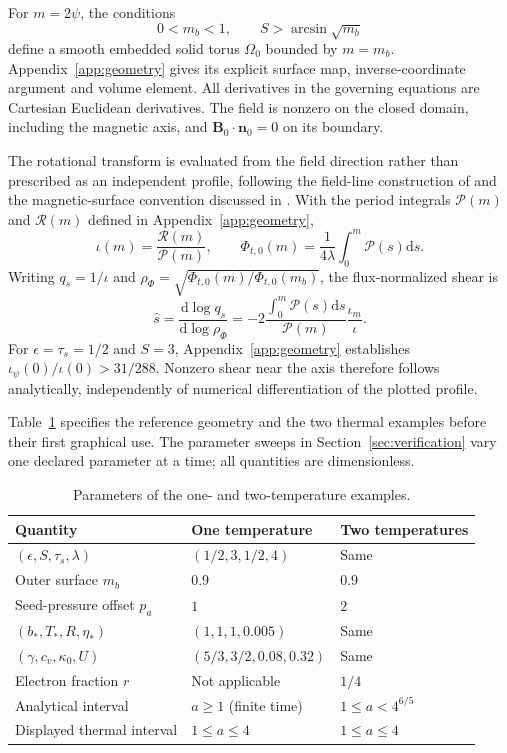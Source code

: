 \documentclass[11pt,a4paper]{article}
\theoremstyle{remark}\newtheorem{remark}{Remark}
\numberwithin{equation}{section}
\newcommand{\dd}{\mathrm{d}}
\newcommand{\BB}{\boldsymbol B}
\newcommand{\nn}{\boldsymbol n}
\begin{document}
For $m=2\psi$, the conditions
\begin{equation}
0<m_b<1,\qquad S>\arcsin\sqrt{m_b}
\label{eq:regularity}
\end{equation}
define a smooth embedded solid torus $\Omega_0$ bounded by $m=m_b$. Appendix~\ref{app:geometry} gives its explicit surface map, inverse-coordinate argument and volume element. All derivatives in the governing equations are Cartesian Euclidean derivatives. The field is nonzero on the closed domain, including the magnetic axis, and $\BB_0\cdot\nn_0=0$ on its boundary.

The rotational transform is evaluated from the field direction rather than prescribed as an independent profile, following the field-line construction of \citet{Landreman,Issan} and the magnetic-surface convention discussed in \citet{Helander2014}. With the period integrals $\mathcal P(m)$ and $\mathcal R(m)$ defined in Appendix~\ref{app:geometry},
\begin{equation}
\iota(m)=\frac{\mathcal R(m)}{\mathcal P(m)},\qquad
\Phi_{t,0}(m)=\frac1{4\lambda}\int_0^m\mathcal P(s)\dd s.
\label{eq:transform}
\end{equation}
Writing $q_s=1/\iota$ and $\rho_\Phi=\sqrt{\Phi_{t,0}(m)/\Phi_{t,0}(m_b)}$, the flux-normalized shear is
\begin{equation}
\widehat s=\frac{\dd\log q_s}{\dd\log\rho_\Phi}
=-2\frac{\int_0^m\mathcal P(s)\dd s}{\mathcal P(m)}\frac{\iota_m}{\iota}.
\label{eq:shear}
\end{equation}
For $\epsilon=\tau_s=1/2$ and $S=3$, Appendix~\ref{app:geometry} establishes $\iota_\psi(0)/\iota(0)>31/288$. Nonzero shear near the axis therefore follows analytically, independently of numerical differentiation of the plotted profile.

Table~\ref{tab:parameters} specifies the reference geometry and the two thermal examples before their first graphical use. The parameter sweeps in Section~\ref{sec:verification} vary one declared parameter at a time; all quantities are dimensionless.

\begin{table}[H]
\centering
\caption{Parameters of the one- and two-temperature examples.}
\label{tab:parameters}
\begin{tabular}{@{}lll@{}}\toprule
Quantity & One temperature & Two temperatures\\\midrule
$(\epsilon,S,\tau_s,\lambda)$ & $(1/2,3,1/2,4)$ & Same\\
Outer surface $m_b$ & $0.9$ & $0.9$\\
Seed-pressure offset $p_a$ & $1$ & $2$\\
$(b_*,T_*,R,\eta_*)$ & $(1,1,1,0.005)$ & Same\\
$(\gamma,c_v,\kappa_0,U)$ & $(5/3,3/2,0.08,0.32)$ & Same\\
Electron fraction $r$ & Not applicable & $1/4$\\
Analytical interval & $a\ge1$ (finite time) & $1\le a<4^{6/5}$\\
Displayed thermal interval & $1\le a\le4$ & $1\le a\le4$\\\bottomrule
\end{tabular}
\end{table}
\end{document}
